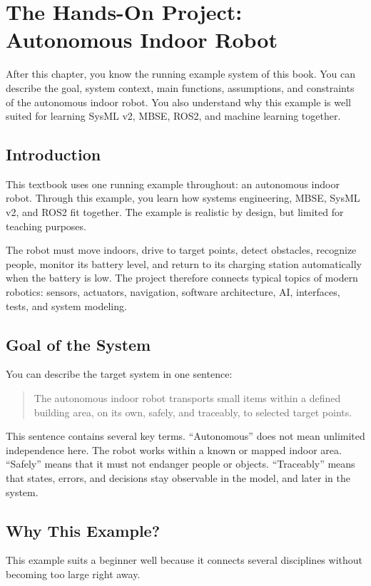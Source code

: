 \chapter{The Hands-On Project: Autonomous Indoor Robot}

\begin{lernziele}
After this chapter, you know the running example system of this book. You can describe the goal, system context, main functions, assumptions, and constraints of the autonomous indoor robot. You also understand why this example is well suited for learning SysML v2, MBSE, ROS2, and machine learning together.
\end{lernziele}

\section{Introduction}
This textbook uses one running example throughout: an autonomous indoor robot. Through this example, you learn how systems engineering, MBSE, SysML v2, and ROS2 fit together. The example is realistic by design, but limited for teaching purposes.

The robot must move indoors, drive to target points, detect obstacles, recognize people, monitor its battery level, and return to its charging station automatically when the battery is low. The project therefore connects typical topics of modern robotics: sensors, actuators, navigation, software architecture, AI, interfaces, tests, and system modeling.

\section{Goal of the System}
You can describe the target system in one sentence:

\begin{quote}
The autonomous indoor robot transports small items within a defined building area, on its own, safely, and traceably, to selected target points.
\end{quote}

This sentence contains several key terms. \enquote{Autonomous} does not mean unlimited independence here. The robot works within a known or mapped indoor area. \enquote{Safely} means that it must not endanger people or objects. \enquote{Traceably} means that states, errors, and decisions stay observable in the model, and later in the system.

\section{Why This Example?}
This example suits a beginner well because it connects several disciplines without becoming too large right away.

